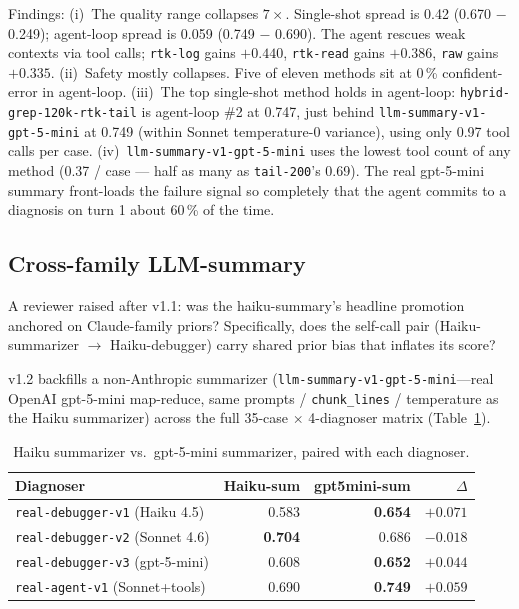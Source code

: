 \documentclass{article}
\begin{document}
Findings:
(i)~The quality range collapses $7\times$. Single-shot spread is
0.42 (0.670 $-$ 0.249); agent-loop spread is 0.059 (0.749 $-$
0.690). The agent rescues weak contexts via tool calls;
\texttt{rtk-log} gains $+0.440$, \texttt{rtk-read} gains $+0.386$,
\texttt{raw} gains $+0.335$.
(ii)~Safety mostly collapses. Five of eleven methods sit at 0\,\%
confident-error in agent-loop.
(iii)~The top single-shot method holds in agent-loop:
\texttt{hybrid-grep-120k-rtk-tail} is agent-loop \#2 at 0.747, just
behind \texttt{llm-summary-v1-gpt-5-mini} at 0.749 (within Sonnet
temperature-0 variance), using only 0.97 tool calls per case.
(iv)~\texttt{llm-summary-v1-gpt-5-mini} uses the lowest tool count
of any method (0.37 / case --- half as many as
\texttt{tail-200}'s 0.69). The real gpt-5-mini summary front-loads
the failure signal so completely that the agent commits to a
diagnosis on turn 1 about 60\,\% of the time.

\subsection{Cross-family LLM-summary}
\label{sec:crossfamily}

A reviewer raised after v1.1: was the haiku-summary's headline
promotion anchored on Claude-family priors? Specifically, does the
self-call pair (Haiku-summarizer $\to$ Haiku-debugger) carry shared
prior bias that inflates its score?

v1.2 backfills a non-Anthropic summarizer
(\texttt{llm-summary-v1-gpt-5-mini}---real OpenAI gpt-5-mini
map-reduce, same prompts / \texttt{chunk\_lines} / temperature as
the Haiku summarizer) across the full 35-case $\times$ 4-diagnoser
matrix (Table~\ref{tab:crossfamily}).

\begin{table}[h]
\centering
\small
\caption{Haiku summarizer vs.\ gpt-5-mini summarizer, paired with
  each diagnoser.}
\label{tab:crossfamily}
\begin{tabular}{lrrr}
\toprule
\textbf{Diagnoser} & \textbf{Haiku-sum} & \textbf{gpt5mini-sum} & $\Delta$ \\
\midrule
\texttt{real-debugger-v1} (Haiku 4.5)  & 0.583 & \textbf{0.654} & $+0.071$ \\
\texttt{real-debugger-v2} (Sonnet 4.6) & \textbf{0.704} & 0.686 & $-0.018$ \\
\texttt{real-debugger-v3} (gpt-5-mini) & 0.608 & \textbf{0.652} & $+0.044$ \\
\texttt{real-agent-v1} (Sonnet+tools)  & 0.690 & \textbf{0.749} & $+0.059$ \\
\bottomrule
\end{tabular}
\end{table}
\end{document}
